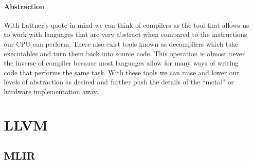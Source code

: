 \paragraph{Abstraction} With Lattner's quote in mind we can think of compilers as the tool that allows us to work with languages that are very abstract when compared to the instructions our \ac{CPU} can perform.
There also exist tools known as decompilers which take executables and turn them back into source code.
This operation is almost never the inverse of compiler because most languages allow for many ways of writing code that performs the same task.
With these tools we can raise and lower our levels of abstraction as desired and further push the details of the ``metal'' or hardware implementation away.


\section{LLVM}

\subsection{\acf{MLIR}}